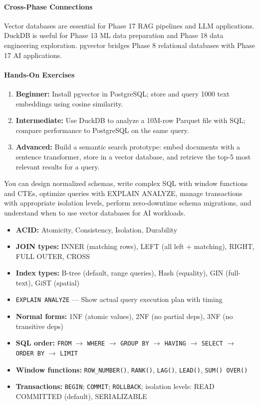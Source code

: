 \documentclass[11pt, a4paper, oneside]{report}
\begin{document}
\paragraph{Cross-Phase Connections} Vector databases are essential for Phase 17 RAG pipelines and LLM applications. DuckDB is useful for Phase 13 ML data preparation and Phase 18 data engineering exploration. pgvector bridges Phase 8 relational databases with Phase 17 AI applications.

\paragraph{Hands-On Exercises}
\begin{enumerate}[leftmargin=*]
\item \textbf{Beginner:} Install pgvector in PostgreSQL; store and query 1000 text embeddings using cosine similarity.
\item \textbf{Intermediate:} Use DuckDB to analyze a 10M-row Parquet file with SQL; compare performance to PostgreSQL on the same query.
\item \textbf{Advanced:} Build a semantic search prototype: embed documents with a sentence transformer, store in a vector database, and retrieve the top-5 most relevant results for a query.
\end{enumerate}

\begin{microcheckpoint}
You can design normalized schemas, write complex SQL with window functions and CTEs, optimize queries with EXPLAIN ANALYZE, manage transactions with appropriate isolation levels, perform zero-downtime schema migrations, and understand when to use vector databases for AI workloads.
\end{microcheckpoint}

\begin{cheatsheetbox}
\begin{itemize}[leftmargin=*]
\item \textbf{ACID:} Atomicity, Consistency, Isolation, Durability
\item \textbf{JOIN types:} INNER (matching rows), LEFT (all left + matching), RIGHT, FULL OUTER, CROSS
\item \textbf{Index types:} B-tree (default, range queries), Hash (equality), GIN (full-text), GiST (spatial)
\item \texttt{EXPLAIN ANALYZE} --- Show actual query execution plan with timing
\item \textbf{Normal forms:} 1NF (atomic values), 2NF (no partial deps), 3NF (no transitive deps)
\item \textbf{SQL order:} \texttt{FROM} $\to$ \texttt{WHERE} $\to$ \texttt{GROUP BY} $\to$ \texttt{HAVING} $\to$ \texttt{SELECT} $\to$ \texttt{ORDER BY} $\to$ \texttt{LIMIT}
\item \textbf{Window functions:} \texttt{ROW\_NUMBER()}, \texttt{RANK()}, \texttt{LAG()}, \texttt{LEAD()}, \texttt{SUM() OVER()}
\item \textbf{Transactions:} \texttt{BEGIN}; \texttt{COMMIT}; \texttt{ROLLBACK}; isolation levels: READ COMMITTED (default), SERIALIZABLE
\end{itemize}
\end{cheatsheetbox}
\end{document}

